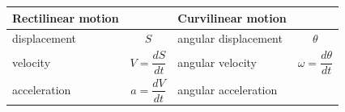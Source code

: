 \documentclass[
]{book}
\begin{document}
\begin{longtable}[]{@{}llll@{}}
\toprule
\begin{minipage}[b]{0.17\columnwidth}\raggedright
Rectilinear motion\strut
\end{minipage} & \begin{minipage}[b]{0.21\columnwidth}\raggedright
\strut
\end{minipage} & \begin{minipage}[b]{0.19\columnwidth}\raggedright
Curvilinear motion\strut
\end{minipage} & \begin{minipage}[b]{0.31\columnwidth}\raggedright
\strut
\end{minipage}\tabularnewline
\midrule
\endhead
\begin{minipage}[t]{0.17\columnwidth}\raggedright
displacement\strut
\end{minipage} & \begin{minipage}[t]{0.21\columnwidth}\raggedright
\[S\]\strut
\end{minipage} & \begin{minipage}[t]{0.19\columnwidth}\raggedright
angular displacement\strut
\end{minipage} & \begin{minipage}[t]{0.31\columnwidth}\raggedright
\[\theta\]\strut
\end{minipage}\tabularnewline
\begin{minipage}[t]{0.17\columnwidth}\raggedright
velocity\strut
\end{minipage} & \begin{minipage}[t]{0.21\columnwidth}\raggedright
\[V = \frac{dS}{dt}\]\strut
\end{minipage} & \begin{minipage}[t]{0.19\columnwidth}\raggedright
angular velocity\strut
\end{minipage} & \begin{minipage}[t]{0.31\columnwidth}\raggedright
\[\omega = \frac{d\theta}{dt}\]\strut
\end{minipage}\tabularnewline
\begin{minipage}[t]{0.17\columnwidth}\raggedright
acceleration\strut
\end{minipage} & \begin{minipage}[t]{0.21\columnwidth}\raggedright
\[a = \frac{dV}{dt}\]\strut
\end{minipage} & \begin{minipage}[t]{0.19\columnwidth}\raggedright
angular acceleration\strut

\end{minipage}
\end{longtable}
\end{document}
